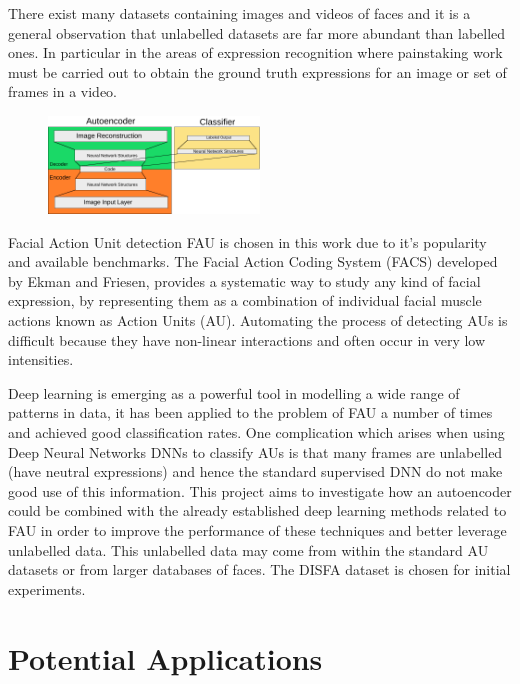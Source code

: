\documentclass[11pt,twoside]{report}
\begin{document}
There exist many datasets containing images and videos of faces and it is a general
observation that unlabelled datasets are far more abundant than labelled ones.
In particular in the areas of expression recognition where painstaking work
must be carried out to obtain the ground truth expressions for an image or set of
frames in a video.

\begin{figure}
 \centering
 \includegraphics[width=0.5\textwidth]{illustrations/network_01.pdf}
\end{figure}

Facial Action Unit detection FAU \cite{Corneanu2016} is chosen in this work due
to it's popularity and available benchmarks.
The Facial Action Coding System (FACS) developed by Ekman and Friesen,
provides a systematic way to study any kind of facial expression,
by representing them as a combination of individual facial muscle actions
known as Action Units (AU). Automating the process of detecting AUs is difficult
because they have non-linear interactions and often occur in very low intensities.

Deep learning is emerging as a powerful tool in modelling a wide range of patterns
in data, it has been applied to the problem of FAU a number of times and achieved
good classification rates. One complication which arises when using Deep Neural
Networks DNNs to classify AUs is that many frames are unlabelled (have neutral expressions)
and hence the standard supervised DNN do not make good use of this information.
This project aims to investigate how an autoencoder could be combined with the
already established deep learning methods related to FAU in order to improve the performance
of these techniques and better leverage unlabelled data. This unlabelled data may
come from within the standard AU datasets or from larger databases of faces.
The DISFA dataset is chosen for initial experiments.
\section{Potential Applications}
\end{document}
